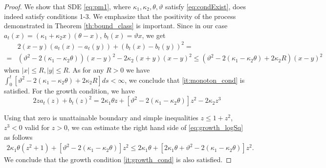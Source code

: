\documentclass[11pt,a4paper] {article}
\begin{document}
\begin{proof}
We show that SDE \eqref{eq:pm1}, where  $\kappa_1, \kappa_2, \theta, \vartheta$ satisfy \eqref{eq:condExist}, does indeed satisfy conditions 1-3. We emphasize that the positivity of the process demonstrated in Theorem \ref{th:bound_class} is important. Since in our case $a_t(x)=(\kappa_1+\kappa_2 x)(\theta-x)$, $b_t(x)=\vartheta x$, we get
\begin{align*}
&2(x-y)(a_t(x)-a_t(y))+(b_t(x)-b_t(y))^2=\\
=&\left(\vartheta^2-2(\kappa_1-\kappa_2\theta)\right)(x-y)^2-2\kappa_2(x+y)(x-y)^2
\le\left(\vartheta^2-2(\kappa_1-\kappa_2\theta)+2\kappa_2R\right)(x-y)^2
\end{align*}
when  $|x|\le R, |y|\le R$. As for any $R>0$ we have $\int_0^t\left[\vartheta^2-2(\kappa_1-\kappa_2\theta)+2\kappa_2R\right]ds<\infty$, we conclude that \ref{it:monoton_cond} is satisfied. For the growth condition, we have
\begin{equation}\label{eq:growth_logSq}
2za_t(z)+b_t(z)^2= 2\kappa_1\theta z+\left[\vartheta^2-2(\kappa_1-\kappa_2\theta)\right]z^2-2\kappa_2z^3
\end{equation}

Using that zero is unattainable boundary and simple inequalities $z\le 1+z^2$, $z^3<0$ 
valid for $z>0$, we can estimate the right hand side of \eqref{eq:growth_logSq} as follows
\begin{equation*}
\begin{split}
2\kappa_1\theta (z^2+1)+\left[\vartheta^2-2(\kappa_1-\kappa_2\theta)\right]z^2\le 
2\kappa_1\theta +\left[2\kappa_1\theta+\vartheta^2-2(\kappa_1-\kappa_2\theta)\right]z^2.
\end{split}
\end{equation*}
We conclude that the growth condition \ref{it:growth_cond} is also satisfied. 
\end{proof}
\end{document}
